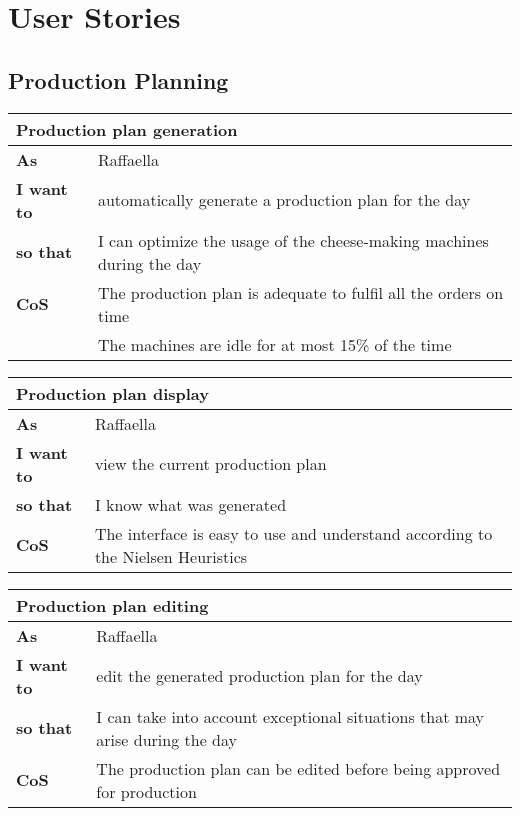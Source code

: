 \chapter{User Stories}
\label{app:user-stories}


\section{Production Planning}

\begin{tabularx}{\textwidth}{lX}
  \toprule
  \multicolumn{2}{l}{\textbf{Production plan generation}} \\
  \midrule
  \textbf{As} & Raffaella \\
  \textbf{I want to} & automatically generate a production plan for the day \\
  \textbf{so that} & I can optimize the usage of the cheese-making machines during the day \\
  \midrule
  \textbf{CoS} & The production plan is adequate to fulfil all the orders on time \\
  & The machines are idle for at most 15\% of the time \\
  \bottomrule
\end{tabularx}

\begin{tabularx}{\textwidth}{lX}
  \toprule
  \multicolumn{2}{l}{\textbf{Production plan display}} \\
  \midrule
  \textbf{As} & Raffaella \\
  \textbf{I want to} & view the current production plan \\
  \textbf{so that} & I know what was generated \\
  \midrule
  \textbf{CoS} & The interface is easy to use and understand according to the Nielsen Heuristics~\cite{cit:nielsen} \\
  \bottomrule
\end{tabularx}

\begin{tabularx}{\textwidth}{lX}
  \toprule
  \multicolumn{2}{l}{\textbf{Production plan editing}} \\
  \midrule
  \textbf{As} & Raffaella \\
  \textbf{I want to} & edit the generated production plan for the day \\
  \textbf{so that} & I can take into account exceptional situations that may arise during the day \\
  \midrule
  \textbf{CoS} & The production plan can be edited before being approved for production \\
  \bottomrule
\end{tabularx}

